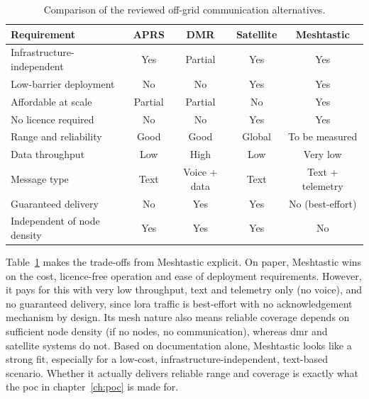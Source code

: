 \begin{table}[H]
  \centering
  \begin{tabular}{lcccc}
    \toprule
    \textbf{Requirement} & \textbf{APRS} & \textbf{DMR} & \textbf{Satellite} & \textbf{Meshtastic} \\
    \midrule
    Infrastructure-independent   & Yes     & Partial & Yes    & Yes             \\
    Low-barrier deployment       & No      & No      & Yes    & Yes             \\
    Affordable at scale          & Partial & Partial & No     & Yes             \\
    No licence required          & No      & No      & Yes    & Yes             \\
    Range and reliability        & Good    & Good    & Global & To be measured  \\
    \midrule
    Data throughput              & Low     & High    & Low    & Very low        \\
    Message type                 & Text    & Voice + data & Text & Text + telemetry \\
    Guaranteed delivery          & No      & Yes     & Yes    & No (best-effort) \\
    Independent of node density  & Yes     & Yes     & Yes    & No              \\
    \bottomrule
  \end{tabular}
  \caption[Comparison of off-grid communication alternatives.]{\label{tab:sota-comparison}Comparison of the reviewed off-grid communication alternatives.}
\end{table}

Table~\ref{tab:sota-comparison} makes the trade-offs from Meshtastic explicit.
On paper, Meshtastic wins on the cost, licence-free operation and ease of deployment requirements. However, it pays for this with very low throughput, text and telemetry only (no voice), and no guaranteed delivery, since \gls{lora} traffic is best-effort with no acknowledgement mechanism by design.
Its mesh nature also means reliable coverage depends on sufficient node density (if no nodes, no communication), whereas \gls{dmr} and satellite systems do not.
Based on documentation alone, Meshtastic looks like a strong fit, especially for a low-cost, infrastructure-independent, text-based scenario. Whether it actually delivers reliable range and coverage is exactly what the \gls{poc} in chapter~\ref{ch:poc} is made for.
